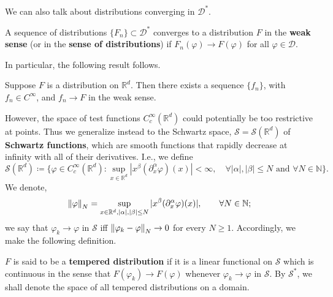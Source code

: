 \documentclass{article}
\begin{document}
We can also talk about distributions converging in $\mathcal{D}^{\ast}$. 

\begin{definition}
	A sequence of distributions $\{F_{n}\} \subset \mathcal{D}^{\ast}$ converges to a distribution $F$ in the \textbf{weak sense} (or in the \textbf{sense of distributions}) if $F_{n}(\varphi) \to F(\varphi)$ for all $\varphi \in \mathcal{D}$.
\end{definition} 

In particular, the following result follows. 
\begin{prop}
	Suppose $F$ is a distribution on $\mathbb{R}^{d}$. Then there exists a sequence $\{f_{n}\}$, with $f_{n} \in C^{\infty}$, and $f_{n} \to F$ in the weak sense. 
\end{prop}

However, the space of test functions $C_{c}^{\infty}(\mathbb{R}^{d})$ could potentially be too restrictive at points. Thus we generalize instead to the Schwartz space, $\mathcal{S} = \mathcal{S}(\mathbb{R}^{d})$ of \textbf{Schwartz functions}, which are smooth functions that rapidly decrease at infinity with all of their derivatives. I.e., we define 
\begin{equation*}
	\mathcal{S}(\mathbb{R}^{d}) \coloneqq \{\varphi \in C_{c}^{\infty}(\mathbb{R}^{d}): \sup_{x \in \mathbb{R}^{d}}|x^{\beta}(\partial^{\alpha}_{x}\varphi)(x)| < \infty, \quad \forall |\alpha|, |\beta| \leq N \text{ and } \forall N \in \mathbb{N}\}. 
\end{equation*}
We denote, 
\begin{equation*}
	\left\Vert \varphi \right\Vert_{N} = \sup_{x \in \mathbb{R}^{d}, |\alpha|,|\beta| \leq N}|x^{\beta}(\partial_{x}^{\alpha}\varphi)(x)|, \qquad \forall N \in \mathbb{N}; 
\end{equation*}
we say that $\varphi_{k} \to \varphi$ in $\mathcal{S}$ iff $\left\Vert \varphi_{k} - \varphi \right\Vert_{N} \to 0$ for every $N \geq 1$. Accordingly, we make the following definition. 

\begin{definition}
	$F$ is said to be a \textbf{tempered distribution} if it is a linear functional on $\mathcal{S}$ which is continuous in the sense that $F(\varphi_{k}) \to F(\varphi)$ whenever $\varphi_{k} \to \varphi$ in $\mathcal{S}$. By $\mathcal{S}^{\ast}$, we shall denote the space of all tempered distributions on a domain. 
\end{definition}
\end{document}
